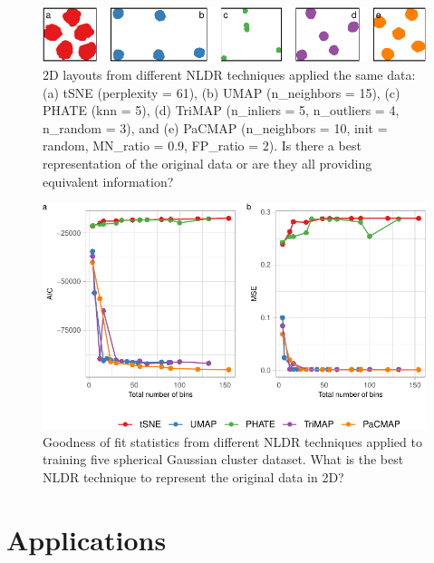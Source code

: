 \documentclass[
  12pt]{article}
\begin{document}
\begin{figure}

{\centering \includegraphics[width=1\textwidth,height=\textheight]{paper_files/figure-pdf/fig-nldervis5Gau-1.pdf}

}

\caption{\label{fig-nldervis5Gau}2D layouts from different NLDR
techniques applied the same data: (a) tSNE (perplexity = 61), (b) UMAP
(n\_neighbors = 15), (c) PHATE (knn = 5), (d) TriMAP (n\_inliers = 5,
n\_outliers = 4, n\_random = 3), and (e) PaCMAP (n\_neighbors = 10, init
= random, MN\_ratio = 0.9, FP\_ratio = 2). Is there a best
representation of the original data or are they all providing equivalent
information?}

\end{figure}

\begin{figure}

{\centering \includegraphics[width=1\textwidth,height=\textheight]{paper_files/figure-pdf/fig-diagnosticpltGau-1.pdf}

}

\caption{\label{fig-diagnosticpltGau}Goodness of fit statistics from
different NLDR techniques applied to training five spherical Gaussian
cluster dataset. What is the best NLDR technique to represent the
original data in 2D?}

\end{figure}

\hypertarget{sec-applications}{%
\section{Applications}\label{sec-applications}}
\end{document}
